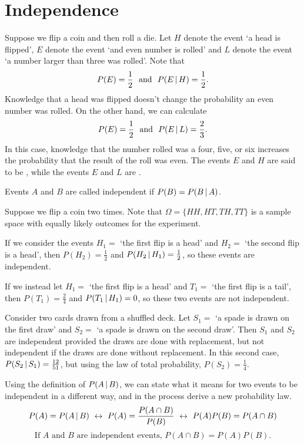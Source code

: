 \section{Independence}\label{IndependenceOfEvents}

Suppose we flip a coin and then roll a die. Let $H$ denote the event `a head is flipped', $E$ denote the event `and even number is rolled' and $L$ denote the event `a number larger than three was rolled'. Note that
$$P(E) = \frac{1}{2} \text{ \ and \ } P(E \,|\, H) = \frac{1}{2}.$$
Knowledge that a head was flipped doesn't change the probability an even number was rolled. On the other hand, we can calculate 
$$P(E) = \frac{1}{2} \text{ \ and \ } P(E \,|\, L) = \frac{2}{3}.$$
In this case, knowledge that the number rolled was a four, five, or six increases the probability that the result of the roll was even. The events $E$ and $H$ are said to be , while the events $E$ and $L$ are .
\begin{defn}\label{independentevents}
Events $A$ and $B$ are called independent if $P(B) = P(B \,|\, A)$.
\end{defn}
\begin{examp}Suppose we flip a coin two times. Note that $\Omega = \{HH, HT, TH, TT\}$ is a sample space with equally likely outcomes for the experiment.
\par
\noindent If we consider the events $H_1 =$ `the first flip is a head' and $H_2 =$ `the second flip is a head', then $P(H_2) = \frac{1}{2}$ and $P(H_2 \,|\, H_1) = \frac{1}{2}$, so these events are independent.
\par
\noindent If we instead let $H_1 =$ `the first flip is a head' and $T_1 =$ `the first flip is a tail', then $P(T_1) = \frac{2}{4}$ and $P(T_1 \,|\, H_1) = 0$, so these two events are not independent.
\end{examp}
\begin{examp}
Consider two cards drawn from a shuffled deck. Let $S_1 =$ `a spade is drawn on the first draw' and $S_2 =$ `a spade is drawn on the second draw'. Then $S_1$ and $S_2$ are independent provided the draws are done with replacement, but not independent if the draws are done without replacement. In this second case, $P(S_2 \,|\, S_1) = \frac{12}{51}$, but using the law of total probability, $P(S_2) = \frac{1}{4}$.
\end{examp}
\par
Using the definition of $P(A \,|\, B)$, we can state what it means for two events to be independent in a different way, and in the process derive a new probability law.
$$P(A) = P(A \,|\, B) \ \leftrightarrow\  P(A) = \frac{P(A \cap B)}{P(B)} \ \leftrightarrow\  P(A)P(B) = P(A \cap B)$$
$$\text{If }A\text{ and }B\text{ are independent events, }P(A \cap B) = P(A)P(B).$$

